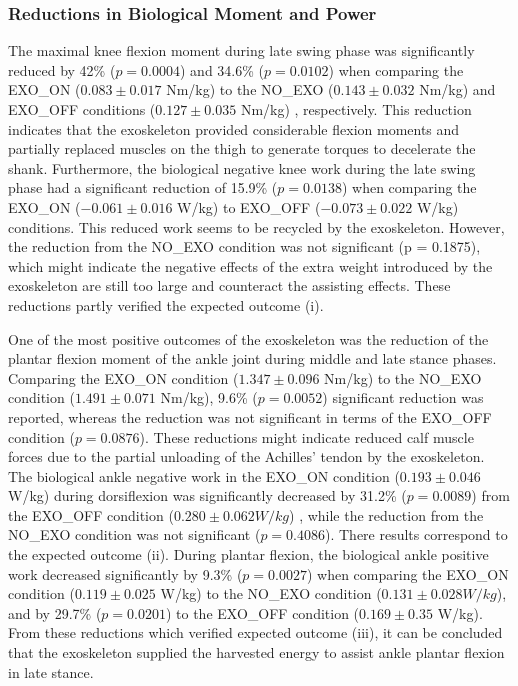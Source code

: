 \documentclass[twocolumn,cleanfoot,10pt]{asme2ej}
\begin{document}
\subsubsection{Reductions in Biological Moment and Power}
The maximal knee flexion moment during late swing phase was significantly reduced by 42\% ($p = 0.0004$) and 34.6\% ($p = 0.0102$) when comparing the EXO\_ON ($0.083\pm0.017$ Nm/kg) to the NO\_EXO ($0.143\pm0.032$ Nm/kg) and EXO\_OFF conditions ($0.127\pm0.035$ Nm/kg) , respectively.
This reduction indicates that the exoskeleton provided considerable flexion moments and partially replaced muscles on the thigh to generate torques to decelerate the shank.
Furthermore, the biological negative knee work during the late swing phase had a significant reduction of 15.9\% ($p = 0.0138$) when comparing the EXO\_ON ($-0.061\pm0.016$ W/kg) to EXO\_OFF ($-0.073\pm0.022$ W/kg) conditions.
This reduced work seems to be recycled by the exoskeleton. However, the reduction from the NO\_EXO condition was not significant (p = 0.1875), which might indicate the negative effects of the extra weight introduced by the exoskeleton are still too large and counteract the assisting effects.
These reductions partly verified the expected outcome (i).

One of the most positive outcomes of the exoskeleton was the reduction of the plantar flexion moment of the ankle joint during middle and late stance phases.
Comparing the EXO\_ON condition ($1.347\pm0.096$ Nm/kg) to the NO\_EXO condition ($1.491\pm0.071$ Nm/kg), 9.6\% ($p = 0.0052$) significant reduction was reported, whereas the reduction was not significant in terms of the EXO\_OFF  condition ($p = 0.0876$).
These reductions might indicate reduced calf muscle forces due to the partial unloading of the Achilles’ tendon by the exoskeleton.
The biological ankle negative work in the EXO\_ON condition ($0.193\pm0.046$ W/kg) during dorsiflexion was significantly decreased by 31.2\% ($p = 0.0089$) from the EXO\_OFF condition ($0.280\pm0.062 W/kg$) , while the reduction from the NO\_EXO condition was not significant ($p = 0.4086$).
There results correspond to the expected outcome (ii).
During plantar flexion, the biological ankle positive work decreased significantly by 9.3\% ($p = 0.0027$) when comparing the EXO\_ON condition ($0.119\pm0.025$ W/kg) to the NO\_EXO condition ($0.131\pm0.028 W/kg$), and by 29.7\% ($p = 0.0201$) to the EXO\_OFF condition ($0.169\pm0.35$ W/kg).
From these reductions which verified expected outcome (iii), it can be concluded that the exoskeleton supplied the harvested energy to assist ankle plantar flexion in late stance.
\end{document}
